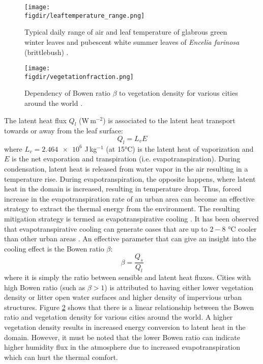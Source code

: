 \begin{figure}[p]
	\centering
	\texttt{[image: \\figdir/leaftemperature\_range.png]}
	\caption{Typical daily range of air and leaf temperature of glabrous green winter leaves and pubescent white summer leaves of \textit{Encelia farinosa} (brittlebush) \citep{Lambers2008}. }
	\label{fig:leaftemperature_range}
\end{figure}

\begin{figure}[p]
	\centering
	\texttt{[image: \\figdir/vegetationfraction.png]}
	\caption{Dependency of Bowen ratio $\beta$ to vegetation density for various cities around the world \citep{Oke2017a}. }
	\label{fig:vegetationfraction}
\end{figure}	

The latent heat flux $Q_l$ (W\,m$^{-2}$) is associated to the latent heat transport towards or away from the leaf surface:
\begin{equation}
Q_l = L_v E
\end{equation}
where $L_v=\num{2.464e6}$ J\,kg$^{-1}$ (at 15\si{\celsius}) is the latent heat of vaporization and $E$ is the net evaporation and transpiration (i.e. evapotranspiration). During condensation, latent heat is released from water vapor in the air resulting in a temperature rise. During evapotranspiration, the opposite happens, where latent heat in the domain is increased, resulting in temperature drop. Thus, forced increase in the evapotranspiration rate of an urban area can become an effective strategy to extract the thermal energy from the environment. The resulting mitigation strategy is termed as evapotranspirative cooling \citep{Taha1997}. It has been observed that evapotranspirative cooling can generate oases that are up to $2-8$ \si{\celsius} cooler than other urban areas \citep{Oke1989,Taha1991}. An effective parameter that can give an insight into the cooling effect is the Bowen ratio $\beta$:
\begin{equation}
\beta = \frac{Q_s}{Q_l}
\end{equation}
where it is simply the ratio between sensible and latent heat fluxes. Cities with high Bowen ratio (such as $\beta > 1$) is attributed to having either lower vegetation density or litter open water surfaces and higher density of impervious urban structures. Figure \ref{fig:vegetationfraction} shows that there is a linear relationship between the Bowen ratio and vegetation density for various cities around the world. A higher vegetation density results in increased energy conversion to latent heat in the domain. However, it must be noted that the lower Bowen ratio can indicate higher humidity flux in the atmosphere due to increased evapotranspiration which can hurt the thermal comfort.

